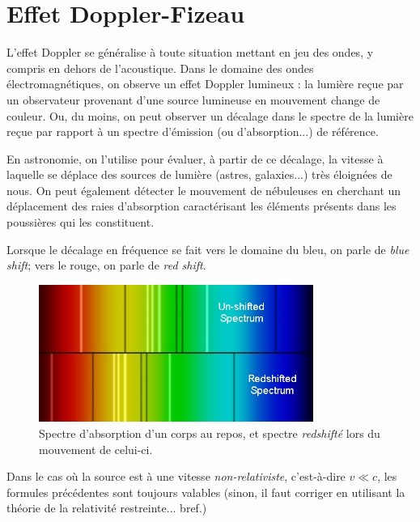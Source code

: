 \documentclass{article}
\theoremstyle{definition}
\begin{document}
\section{Effet Doppler-Fizeau}

L'effet Doppler se généralise à toute situation mettant en jeu des ondes, y compris en dehors de l'acoustique. Dans le domaine des ondes électromagnétiques, on observe un effet Doppler lumineux : la lumière reçue par un observateur provenant d'une source lumineuse en mouvement change de couleur. Ou, du moins, on peut observer un décalage dans le spectre de la lumière reçue par rapport à un spectre d'émission (ou d'absorption...) de référence.

En astronomie, on l'utilise pour évaluer, à partir de ce décalage, la vitesse à laquelle se déplace des sources de lumière (astres, galaxies...) très éloignées de nous. On peut également détecter le mouvement de nébuleuses en cherchant un déplacement des raies d'absorption caractérisant les éléments présents dans les poussières qui les constituent.

Lorsque le décalage en fréquence se fait vers le domaine du bleu, on parle de \textit{blue shift}; vers le rouge, on parle de \textit{red shift}.

\begin{figure}[h]
	\centering
	\includegraphics[width=0.8\textwidth]{parts/doppler/redshift1.jpg}
	\caption{Spectre d'absorption d'un corps au repos, et spectre \textit{redshifté} lors du mouvement de celui-ci.}
\end{figure}

Dans le cas où la source est à une vitesse \textit{non-relativiste}, c'est-à-dire $v\ll c$, les formules précédentes sont toujours valables (sinon, il faut corriger en utilisant la théorie de la relativité restreinte... bref.)
\end{document}
